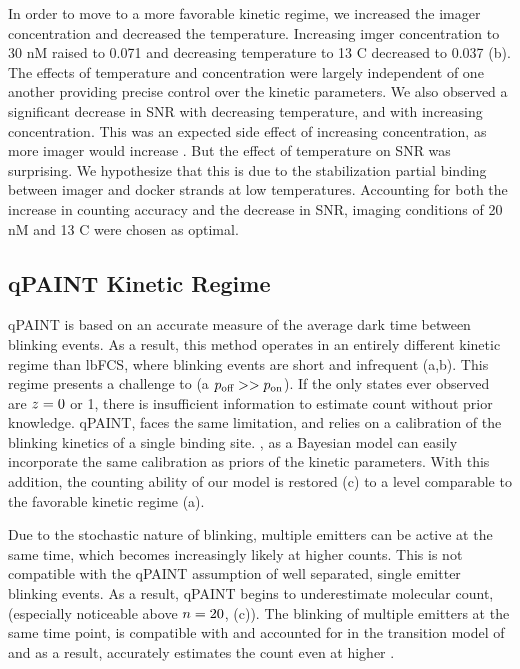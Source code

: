 In order to move to a more favorable kinetic regime, 
we increased the imager concentration and decreased the temperature.
	Increasing imger concentration to 30 nM raised \pon to 0.071 and 
	decreasing temperature to 13 C decreased \poff to 0.037 
	(b).
	The effects of temperature and concentration were largely independent 
	of one another providing precise control over the kinetic parameters. %
	We also observed a significant decrease in SNR with decreasing temperature, 
	and with increasing concentration. 
	This was an expected side effect of increasing concentration, as more imager would increase \rb.
	But the effect of temperature on SNR was surprising. 
	We hypothesize that this is due to the stabilization partial 
	binding between imager and docker strands at low temperatures.
	Accounting for both the increase in counting accuracy and the decrease 
	in SNR, imaging conditions of 20 nM and 13 C were chosen as optimal.

\subsection{qPAINT Kinetic Regime}
qPAINT is based on an accurate measure of the average dark time between blinking events. 
	As a result, this method operates in an entirely different kinetic regime than lbFCS, where blinking 
	events are short and infrequent (a,b).
	This regime presents a challenge to \ours (a $p_\text{off} >> p_\text{on}$). 
	If the only states ever observed are $z_{}=0$ or 1, there is insufficient 
	information to estimate count without prior knowledge.
	qPAINT, faces the same limitation, and relies on a calibration 
	of the blinking kinetics of a single binding site.
	\ours, as a Bayesian model can easily incorporate the same calibration 
	as priors of the kinetic parameters.
	With this addition, the counting ability of our model is restored 
	(c) to a level comparable to the 
	favorable kinetic regime (a).

Due to the stochastic nature of blinking, multiple emitters can 
be active at the same time, which becomes increasingly likely at higher counts.
	This is not compatible with the qPAINT assumption of well separated, 
	single emitter blinking events.
	As a result, qPAINT begins to underestimate molecular count, 
	(especially noticeable above $n=20$, (c)). 
	The blinking of multiple emitters at the same time point, 
	is compatible with and accounted for in the transition model of \ours 
	and as a result, \ours accurately estimates the count even at higher \n.
	
